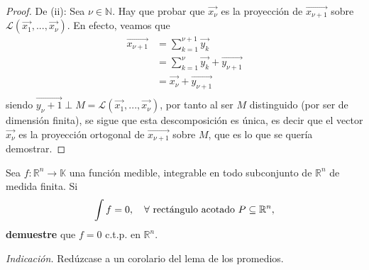 \documentclass[12pt]{report}
\newcounter{it}
\theoremstyle{largebreak}
\newcommand\cf[3]{\ensuremath{#1:#2\rightarrow#3}}
\begin{document}
\begin{proof}
        De (ii): Sea $\nu\in\mathbb{N}$. Hay que probar que $\vec{x_\nu}$ es la proyección de $\vec{x_{\nu+1}}$ sobre $\mathcal{L}(\vec{x_1},...,\vec{x_\nu})$. En efecto, veamos que
        \begin{equation*}
            \begin{split}
                \vec{x_{\nu+1}}&=\sum_{ k=1}^{\nu+1}\vec{y_{k}}\\
                &=\sum_{ k=1}^\nu\vec{y_{k}}+\vec{y_{\nu+1}} \\
                &=\vec{x_\nu}+\vec{y_{\nu+1}} \\
            \end{split}
        \end{equation*}
        siendo $\vec{y_\nu+1}\perp M=\mathcal{L}(\vec{x_1},...,\vec{x_\nu})$, por tanto al ser $M$ distinguido (por ser de dimensión finita), se sigue que esta descomposición es única, es decir que el vector $\vec{x_\nu}$ es la proyección ortogonal de $\vec{x_{\nu+1}}$ sobre $M$, que es lo que se quería demostrar.

    \end{proof}

    \begin{excer}
        Sea $\cf{f}{\mathbb{R}^n}{\mathbb{K}}$ una función medible, integrable en todo subconjunto de $\mathbb{R}^n$ de medida finita. Si
        \begin{equation*}
            \int f=0,\quad\forall\textup{ rectángulo acotado }P\subseteq\mathbb{R}^n,
        \end{equation*}
        \textbf{demuestre} que $f=0$ c.t.p. en $\mathbb{R}^n$.
        
        \textit{Indicación.} Redúzcase a un corolario del lema de los promedios.
    \end{excer}
\end{document}
